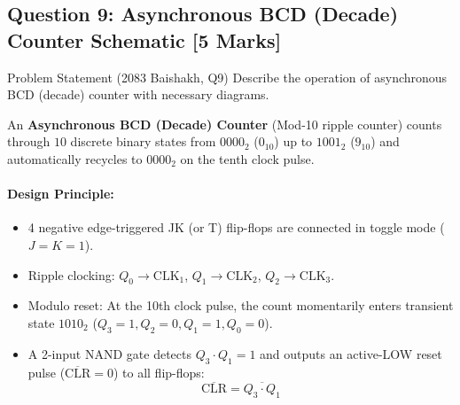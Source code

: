 \documentclass[11pt,a4paper,oneside]{book}
\begin{document}
\vspace{0.6cm}

\subsection{Question 9: Asynchronous BCD (Decade) Counter Schematic [5 Marks]}
\begin{questionbox}{Problem Statement (2083 Baishakh, Q9)}
Describe the operation of asynchronous BCD (decade) counter with necessary diagrams.
\end{questionbox}

An \textbf{Asynchronous BCD (Decade) Counter} (Mod-10 ripple counter) counts through $10$ discrete binary states from $0000_2$ ($0_{10}$) up to $1001_2$ ($9_{10}$) and automatically recycles to $0000_2$ on the tenth clock pulse.

\paragraph{Design Principle:}
\begin{itemize}
  \item 4 negative edge-triggered JK (or T) flip-flops are connected in toggle mode ($J=K=1$).
  \item Ripple clocking: $Q_0 \to \text{CLK}_1$, $Q_1 \to \text{CLK}_2$, $Q_2 \to \text{CLK}_3$.
  \item Modulo reset: At the 10th clock pulse, the count momentarily enters transient state $1010_2$ ($Q_3=1, Q_2=0, Q_1=1, Q_0=0$).
  \item A 2-input NAND gate detects $Q_3 \cdot Q_1 = 1$ and outputs an active-LOW reset pulse ($\overline{\text{CLR}} = 0$) to all flip-flops:
  \[
  \overline{\text{CLR}} = \overline{Q_3 \cdot Q_1}
  \]
\end{itemize}
\end{document}
